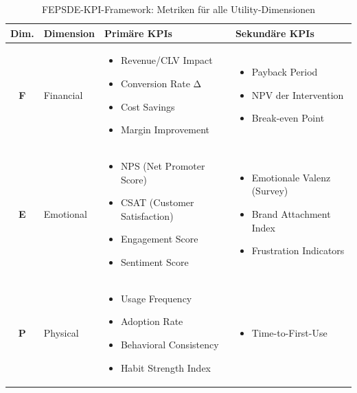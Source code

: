 \begin{table}[htbp]
\centering
\caption{FEPSDE-KPI-Framework: Metriken für alle Utility-Dimensionen}
\label{tab:20-fepsde-kpi}
\renewcommand{\arraystretch}{1.4}
\footnotesize
\begin{tabular}{@{}clp{5cm}p{4cm}@{}}
\toprule
\textbf{Dim.} & \textbf{Dimension} & \textbf{Primäre KPIs} & \textbf{Sekundäre KPIs} \\
\midrule
\textbf{F} & Financial &
\begin{itemize}[nosep, leftmargin=*]
\item Revenue/CLV Impact
\item Conversion Rate Δ
\item Cost Savings
\item Margin Improvement
\end{itemize} &
\begin{itemize}[nosep, leftmargin=*]
\item Payback Period
\item NPV der Intervention
\item Break-even Point
\end{itemize} \\
\midrule
\textbf{E} & Emotional &
\begin{itemize}[nosep, leftmargin=*]
\item NPS (Net Promoter Score)
\item CSAT (Customer Satisfaction)
\item Engagement Score
\item Sentiment Score
\end{itemize} &
\begin{itemize}[nosep, leftmargin=*]
\item Emotionale Valenz (Survey)
\item Brand Attachment Index
\item Frustration Indicators
\end{itemize} \\
\midrule
\textbf{P} & Physical &
\begin{itemize}[nosep, leftmargin=*]
\item Usage Frequency
\item Adoption Rate
\item Behavioral Consistency
\item Habit Strength Index
\end{itemize} &
\begin{itemize}[nosep, leftmargin=*]
\item Time-to-First-Use

\end{itemize}
\end{tabular}
\end{table}
